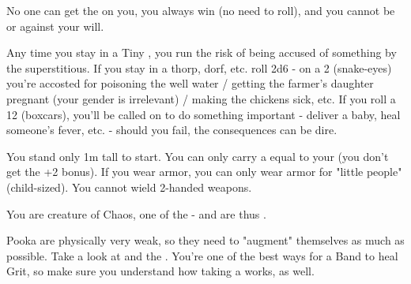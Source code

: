\begin{multicols*}{2}
  
    No one can get the  on you, you always win  (no need to roll), and you cannot be  or  against your will.




  Any time you stay in a Tiny , you run the risk of being accused of something by the superstitious.  If you stay in a  thorp, dorf, etc. roll 2d6 - on a 2 (snake-eyes) you're accosted for poisoning the well water / getting the farmer's daughter pregnant (your gender is irrelevant) / making the chickens sick, etc. If you roll a 12 (boxcars), you'll be called on to do something important - deliver a baby, heal someone's fever, etc. - should you fail, the consequences can be dire.

\cbreak


  You stand only 1m tall to start.  You can only carry a  equal to your \VIG (you don't get the +2 bonus). If you wear armor, you can only wear armor for "little people" (child-sized).  You cannot wield 2-handed weapons.

    
  You are creature of Chaos, one of the  - and are thus .





 

    Pooka are physically very weak, so they need to "augment" themselves as much as possible. Take a look at  and the . You're one of the best ways for a Band to heal Grit, so make sure you understand how taking a  works, as well.


\end{multicols*}
